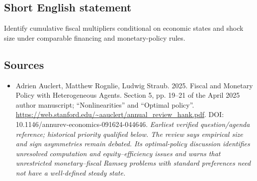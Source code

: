 \documentclass[11pt]{article}
\begin{document}
\subsection{Short English statement}
Identify cumulative fiscal multipliers conditional on economic states and shock size under comparable financing and monetary-policy rules.

\subsection{Sources}
\begin{itemize}\raggedright
\item[\textnormal{[S1]}]\hypertarget{source:30007532:1}{} Adrien Auclert, Matthew Rognlie, Ludwig Straub. 2025. Fiscal and Monetary Policy with Heterogeneous Agents. Section 5, pp. 19–21 of the April 2025 author manuscript; “Nonlinearities” and “Optimal policy”.
\url{https://web.stanford.edu/~aauclert/annual_review_hank.pdf}.
DOI: 10.1146/annurev-economics-091624-044646.
{\small\textit{Earliest verified question/agenda reference; historical priority qualified below. The review says empirical size and sign asymmetries remain debated. Its optimal-policy discussion identifies unresolved computation and equity–efficiency issues and warns that unrestricted monetary–fiscal Ramsey problems with standard preferences need not have a well-defined steady state.}}
\end{itemize}
\end{document}
